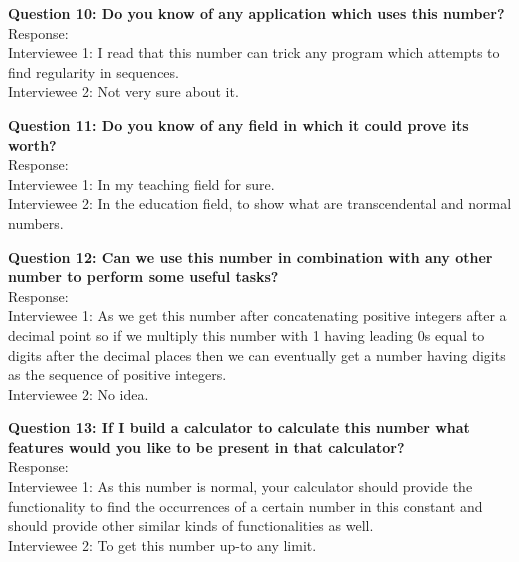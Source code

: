 \documentclass[paper=a4, fontsize=11pt]{report}
\numberwithin{equation}{section}		%
\numberwithin{figure}{section}			%
\numberwithin{table}{section}				%
\begin{document}
\begin{flushleft}
\setlength{\parskip}{\baselineskip}
\textbf{Question 10: Do you know of any application which uses this number? }
\\Response:
\\Interviewee 1: I read that this number can trick any program which attempts to find regularity in sequences.
\\Interviewee 2: Not very sure about it.
\\\hrulefill
\end{flushleft}

\begin{flushleft}
\setlength{\parskip}{\baselineskip}
\textbf{Question 11: Do you know of any field in which it could prove its worth?}
\\Response:
\\Interviewee 1: In my teaching field for sure.
\\Interviewee 2: In the education field, to show what are transcendental and normal numbers.
\\\hrulefill
\end{flushleft}

\begin{flushleft}
\setlength{\parskip}{\baselineskip}
\textbf{Question 12: Can we use this number in combination with any other number to perform some useful tasks?}
\\Response:
\\Interviewee 1: As we get this number after concatenating positive integers after a decimal point  so if we multiply this number with 1 having leading 0s equal to digits after the decimal places then 
we can eventually get a number having digits as the sequence of positive integers.
\\Interviewee 2: No idea.
\\\hrulefill
\end{flushleft}

\begin{flushleft}
\setlength{\parskip}{\baselineskip}
\textbf{Question 13: If I build a calculator to calculate this number what features would you like to be present in that calculator?}
\\Response:
\\Interviewee 1: As this number is normal, your calculator should provide the functionality to find the occurrences of a certain number in this constant and should provide other similar kinds of functionalities as well.
\\Interviewee 2: To get this number up-to any limit.
\\\hrulefill
\end{flushleft}
\end{document}
